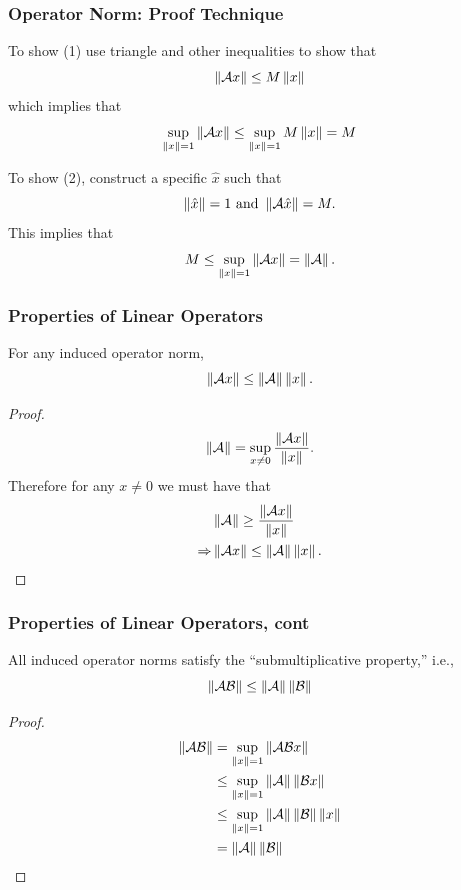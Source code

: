 \documentclass{beamer}
\begin{document}
\begin{frame}\frametitle{Operator Norm: Proof Technique}
	To show (1) use triangle and other inequalities to show that 
	\[ 
	\left\|\mathcal{A}x\right\| \leq M\left\|x\right\| 
	\]
	which implies that
	\[ 
	\sup_{\left\|x\right\| = 1} \left\|\mathcal{A}x\right\| \leq
		\sup_{\left\|x\right\|=1} M\left\|x\right\| = M 
	\]

	\vfill
	
	To show (2), construct a specific $\hat{x}$ such that
	\[ 
	\left\| \hat{x} \right\| = 1 \text{ and } \left\| \mathcal{A}\hat{x} \right\| = M.
	\]
	This implies that
	\[ 
		M \leq \sup_{\left\|x\right\|=1} \left\|\mathcal{A}x\right\| = \left\|\mathcal{A}\right\|.
		\]	
\end{frame}

\begin{frame}\frametitle{Properties of Linear Operators}
	\begin{lemma}
		For any induced operator norm,
		\[ 
		\left\|\mathcal{A}x\right\| \leq \left\|\mathcal{A}\right\|\left\|x\right\|. 
		\]
	\end{lemma}
	
	\begin{proof}
		\[ 
		\left\|\mathcal{A}\right\| = \sup_{x \neq 0} \frac{\left\|\mathcal{A}x\right\|}{\left\|x\right\|}.
		\]
	Therefore for any $x \neq 0$ we must have that
	\begin{align*}
	&\left\|\mathcal{A}\right\| \geq \frac{\left\|\mathcal{A}x\right\|}{\left\|x\right\|} \\
	\Rightarrow & \left\|\mathcal{A} x\right\| \leq \left\|\mathcal{A}\right\|\left\|x\right\|.
	\end{align*}
	\end{proof}	
\end{frame}

\begin{frame}\frametitle{Properties of Linear Operators, cont}
	\begin{lemma}
		All induced operator norms satisfy the ``submultiplicative property,'' i.e.,
		\[ 
			\left\|\mathcal{A}\mathcal{B}\right\| \leq \left\|\mathcal{A}\right\|\left\|\mathcal{B}\right\| 
			\]
	\end{lemma}
	
	\begin{proof}
		\begin{align*}
		\left\|\mathcal{A}\mathcal{B}\right\| &= \sup_{\left\|x\right\|=1}\left\|\mathcal{A}\mathcal{B}x\right\| \\
				  &\leq \sup_{\left\|x\right\| = 1} \left\|\mathcal{A}\right\|\left\|\mathcal{B}x\right\| \\
				  &\leq \sup_{\left\|x\right\|=1}\left\|\mathcal{A}\right\|\left\|\mathcal{B}\right\|\left\|x\right\| \\
				  &= \left\|\mathcal{A}\right\|\left\|\mathcal{B}\right\|
		\end{align*}
	\end{proof}
\end{frame}
\end{document}

